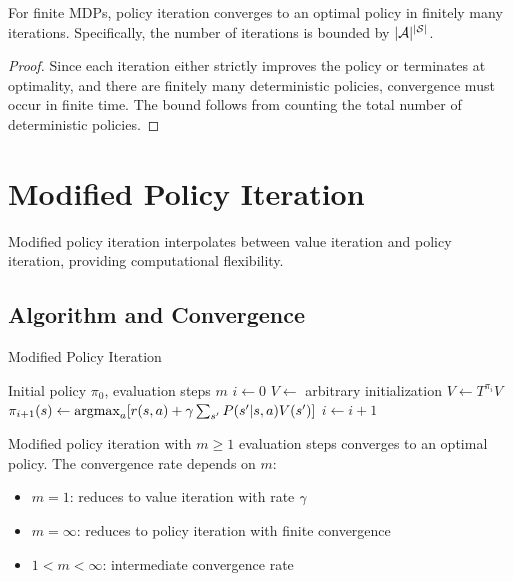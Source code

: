 \begin{theorem}
For finite MDPs, policy iteration converges to an optimal policy in finitely many iterations. Specifically, the number of iterations is bounded by $|\mathcal{A}|^{|\mathcal{S}|}$.
\end{theorem}

\begin{proof}
Since each iteration either strictly improves the policy or terminates at optimality, and there are finitely many deterministic policies, convergence must occur in finite time. The bound follows from counting the total number of deterministic policies.
\end{proof}

\section{Modified Policy Iteration}

Modified policy iteration interpolates between value iteration and policy iteration, providing computational flexibility.

\subsection{Algorithm and Convergence}

\begin{algorithm}
\caption{Modified Policy Iteration}
\begin{algorithmic}
\REQUIRE Initial policy $\pi_0$, evaluation steps $m$
\STATE $i \leftarrow 0$
\REPEAT
    \STATE $V \leftarrow$ arbitrary initialization
        \STATE $V \leftarrow T^{\pi_i} V$
    \ENDFOR
    \STATE $\pi_{i+1}(s) \leftarrow \operatorname*{argmax}_a [r(s,a) + \gamma \sum_{s'} P(s'|s,a) V(s')]$
    \STATE $i \leftarrow i + 1$
\end{algorithmic}
\end{algorithm}

\begin{theorem}
Modified policy iteration with $m \geq 1$ evaluation steps converges to an optimal policy. The convergence rate depends on $m$:
\begin{itemize}
    \item $m = 1$: reduces to value iteration with rate $\gamma$
    \item $m = \infty$: reduces to policy iteration with finite convergence
    \item $1 < m < \infty$: intermediate convergence rate
\end{itemize}
\end{theorem}

